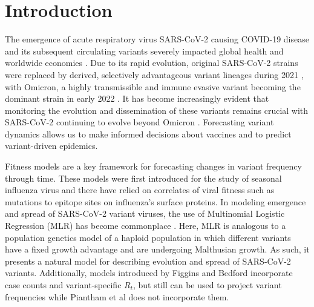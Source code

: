 \documentclass[10pt,letterpaper]{article}
\begin{document}
\linenumbers

\section*{Introduction}

The emergence of acute respiratory virus SARS-CoV-2 causing COVID-19 disease and its subsequent circulating variants severely impacted global health and worldwide economies \cite{onyeaka2021covid19}.
Due to its rapid evolution, original SARS-CoV-2 strains were replaced by derived, selectively advantageous variant lineages during 2021 \cite{campbell2021increased}, with Omicron, a highly transmissible and immune evasive variant becoming the dominant strain in early 2022 \cite{viana2022rapid}.
It has become increasingly evident that monitoring the evolution and dissemination of these variants remains crucial with SARS-CoV-2 continuing to evolve beyond Omicron \cite{carabelli2023sarscov2}.
Forecasting variant dynamics allows us to make informed decisions about vaccines and to predict variant-driven epidemics.

Fitness models are a key framework for forecasting changes in variant frequency through time.
These models were first introduced for the study of seasonal influenza virus \cite{luksza2014predictive, morris2018predictive, huddleston2020integrating} and there have relied on correlates of viral fitness such as mutations to epitope sites on influenza's surface proteins.
In modeling emergence and spread of SARS-CoV-2 variant viruses, the use of Multinomial Logistic Regression (MLR) has become commonplace \cite{annavajhala2021emergence, faria2021genomics, obermeyer2022analysis, susswein2023early}.
Here, MLR is analogous to a population genetics model of a haploid population in which different variants have a fixed growth advantage and are undergoing Malthusian growth.
As such, it presents a natural model for describing evolution and spread of SARS-CoV-2 variants.
Additionally, models introduced by Figgins and Bedford \cite{figgins2022sars} incorporate case counts and variant-specific $R_t$, but still can be used to project variant frequencies while Piantham et al \cite{piantham2021estimating} does not incorporate them.
\end{document}
